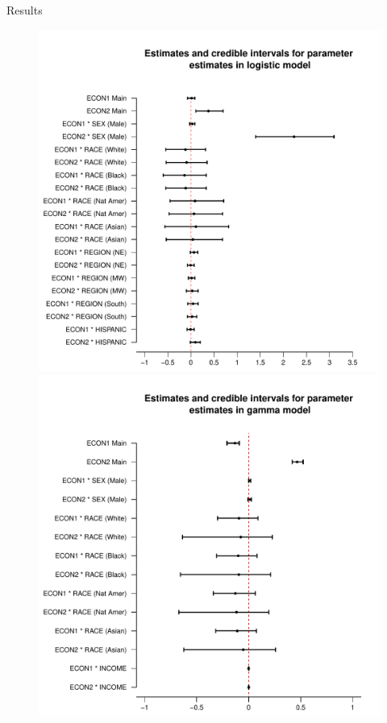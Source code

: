 \documentclass[final]{beamer}
\newcounter{acolumn}%
\begin{document}
\begin{frame}
\begin{acolumns}[t]
\begin{column}{.72\linewidth}
\begin{block}{Results}
     \begin{figure}
      \centering                      
      \begin{minipage}{0.25\textwidth}
      \centering
      \includegraphics{logit_estimates.pdf}
      \end{minipage}%
      \begin{minipage}{0.25\textwidth}
             \centering
             \includegraphics{gamma_estimates.pdf}

\end{minipage}
\end{figure}
\end{block}
\end{column}
\end{acolumns}
\end{frame}
\end{document}
